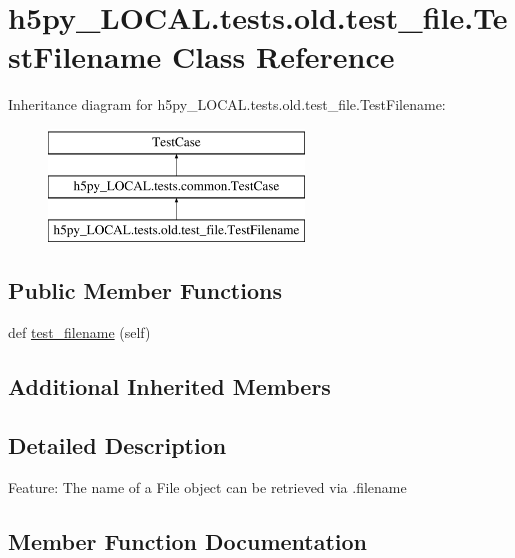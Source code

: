 \hypertarget{classh5py__LOCAL_1_1tests_1_1old_1_1test__file_1_1TestFilename}{}\section{h5py\+\_\+\+L\+O\+C\+A\+L.\+tests.\+old.\+test\+\_\+file.\+Test\+Filename Class Reference}
\label{classh5py__LOCAL_1_1tests_1_1old_1_1test__file_1_1TestFilename}
Inheritance diagram for h5py\+\_\+\+L\+O\+C\+A\+L.\+tests.\+old.\+test\+\_\+file.\+Test\+Filename\+:\begin{figure}[H]
\begin{center}
\leavevmode
\includegraphics[height=3.000000cm]{classh5py__LOCAL_1_1tests_1_1old_1_1test__file_1_1TestFilename}
\end{center}
\end{figure}
\subsection*{Public Member Functions}
\begin{DoxyCompactItemize}
\item 
def \hyperlink{classh5py__LOCAL_1_1tests_1_1old_1_1test__file_1_1TestFilename_ad1dc0655631645dbff76b0bf939ce808}{test\+\_\+filename} (self)
\end{DoxyCompactItemize}
\subsection*{Additional Inherited Members}


\subsection{Detailed Description}
\begin{DoxyVerb}    Feature: The name of a File object can be retrieved via .filename
\end{DoxyVerb}
 

\subsection{Member Function Documentation}
\mbox{\label{classh5py__LOCAL_1_1tests_1_1old_1_1test__file_1_1TestFilename_ad1dc0655631645dbff76b0bf939ce808}} 
